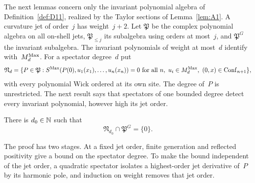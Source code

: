 The next lemmas concern only the invariant polynomial algebra of Definition~\ref{def:D11}, realized by the Taylor sections of Lemma~\ref{lem:A1}. A curvature jet of order~$j$ has weight~$j+2$. Let $\mathfrak P$ be the complex polynomial algebra on all on-shell jets, $\mathfrak P_{\le j}$ its subalgebra using orders at most~$j$, and $\mathfrak P^G$ the invariant subalgebra. The invariant polynomials of weight at most~$d$ identify with~$M_{d}^{\mathrm{Max}}$. For a spectator degree~$d$ put
\begin{equation*}
\mathfrak N_d=\{P\in\mathfrak P:S^{\rm Max}(P(0),u_1(x_1),\ldots,u_n(x_n))=0
\text{ for all }n,\ u_i\in\maxwellspace{d},\ (0,x)\in\Conf{n+1}\},
\end{equation*}
with every polynomial Wick ordered at its own site. The degree of~$P$ is unrestricted. The next result says that spectators of one bounded degree detect every invariant polynomial, however high its jet order.
\begin{lemma}\label{lem:G-detection}
There is $d_0\in\mathbb{N}$ such that
\begin{equation}\label{eq:G-detection}
\mathfrak N_{d_0}\cap\mathfrak P^{G}=\{0\}.
\end{equation}
\end{lemma}
The proof has two stages. At a fixed jet order, finite generation and reflected positivity give a bound on the spectator degree. To make the bound independent of the jet order, a quadratic spectator isolates a highest-order jet derivative of~$P$ by its harmonic pole, and induction on weight removes that jet order.

